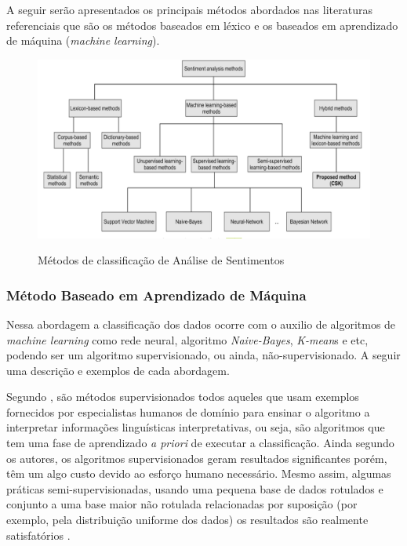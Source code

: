 A seguir serão apresentados os principais métodos abordados nas literaturas referenciais que são os métodos baseados em léxico e os baseados em  aprendizado de máquina (\textit{machine learning}).

\begin{figure}[!h]
\centering 
\caption{Métodos de classificação de Análise de Sentimentos}
\includegraphics[scale=0.70]{imagens/sentimentanalysismethods.png}
\label{fig:SAMethods}
\end{figure}
\newpage

\subsubsection{Método Baseado em Aprendizado de Máquina}

Nessa abordagem a classificação dos dados ocorre com o auxilio de algoritmos de \textit{machine learning} como rede neural, algoritmo \textit{Naive-Bayes}, \textit{K-mean}s e etc, podendo ser um algoritmo supervisionado, ou ainda, não-supervisionado. A seguir uma descrição e exemplos de cada abordagem.


Segundo , são métodos supervisionados todos aqueles que usam exemplos fornecidos por especialistas humanos de domínio para ensinar o algoritmo a interpretar informações linguísticas interpretativas, ou seja, são algoritmos que tem uma fase de aprendizado \textit{a priori} de executar a classificação. Ainda segundo os autores, os algoritmos supervisionados geram resultados significantes porém, têm um algo custo devido ao esforço humano necessário. Mesmo assim, algumas práticas semi-supervisionadas, usando uma pequena base de dados rotulados e conjunto a uma base maior não rotulada relacionadas por suposição (por exemplo, pela distribuição uniforme dos dados) os resultados são realmente satisfatórios \cite{TRUYENS2014153}.


